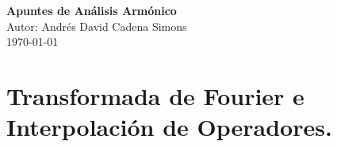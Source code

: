 \documentclass[a4paper,12pt]{book}
\begin{document}
\begin{titlepage}
    \centering
    {\Huge \textbf{Apuntes de Análisis Armónico}}\\[2cm]
    {\Large Autor: Andrés David Cadena Simons}\\[1cm]
    {\Large \today}
\end{titlepage}



\tableofcontents

\chapter{Transformada de Fourier e Interpolación de Operadores.}




  
\end{document}
